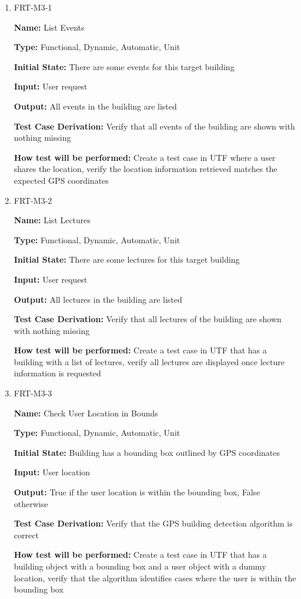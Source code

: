 \documentclass[12pt, titlepage]{article}
\begin{document}
\begin{enumerate}
\item{FRT-M3-1}

\textbf{Name:} List Events

\textbf{Type:} Functional, Dynamic, Automatic, Unit
					
\textbf{Initial State:} There are some events for this target building
					
\textbf{Input:} User request
					
\textbf{Output:} All events in the building are listed

\textbf{Test Case Derivation:} Verify that all events of the building are shown with nothing missing

\textbf{How test will be performed:} Create a test case in UTF where a user shares the location, verify the location information retrieved matches the expected GPS coordinates

\item{FRT-M3-2}

\textbf{Name:} List Lectures

\textbf{Type:} Functional, Dynamic, Automatic, Unit
					
\textbf{Initial State:} There are some lectures for this target building
					
\textbf{Input:} User request
					
\textbf{Output:} All lectures in the building are listed

\textbf{Test Case Derivation:} Verify that all lectures of the building are shown with nothing missing

\textbf{How test will be performed:} Create a test case in UTF that has a building with a list of lectures, verify all lectures are displayed once lecture information is requested

\item{FRT-M3-3}

\textbf{Name:} Check User Location in Bounds

\textbf{Type:} Functional, Dynamic, Automatic, Unit

\textbf{Initial State:} Building has a bounding box outlined by GPS coordinates

\textbf{Input:} User location
					
\textbf{Output:} True if the user location is within the bounding box, False otherwise

\textbf{Test Case Derivation:} Verify that the GPS building detection algorithm is correct

\textbf{How test will be performed:} Create a test case in UTF that has a building object with a bounding box and a user object with a dummy location, verify that the algorithm identifies cases where the user is within the bounding box

\end{enumerate}
\end{document}
